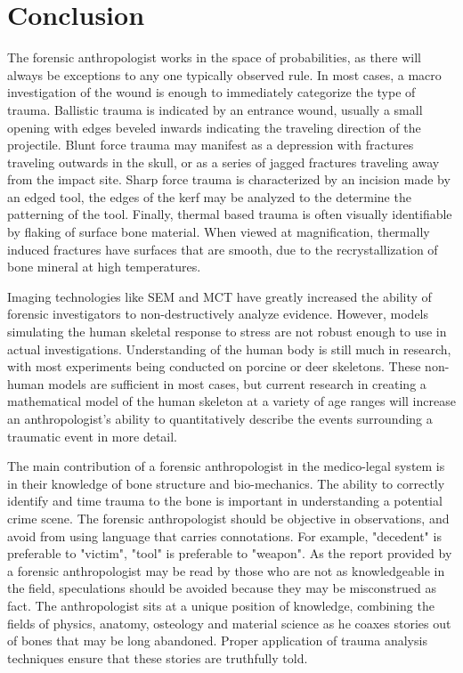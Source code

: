 \documentclass[titlepage]{article}
\begin{document}
\section{Conclusion}
The forensic anthropologist works in the space of probabilities, as there will always be exceptions to any one typically observed rule. In most cases, a macro investigation of the wound is enough to immediately categorize the type of trauma. Ballistic trauma is indicated by an entrance wound, usually a small opening with edges beveled inwards indicating the traveling direction of the projectile. Blunt force trauma may manifest as a depression with fractures traveling outwards in the skull, or as a series of jagged fractures traveling away from the impact site. Sharp force trauma is characterized by an incision made by an edged tool, the edges of the kerf may be analyzed to the determine the patterning of the tool. Finally, thermal based trauma is often visually identifiable by flaking of surface bone material. When viewed at magnification, thermally induced fractures have surfaces that are smooth, due to the recrystallization of bone mineral at high temperatures.

Imaging technologies like SEM and MCT have greatly increased the ability of forensic investigators to non-destructively analyze evidence. However, models simulating the human skeletal response to stress are not robust enough to use in actual investigations. Understanding of the human body is still much in research, with most experiments being conducted on porcine or deer skeletons.\cite{bft} These non-human models are sufficient in most cases, but current research in creating a mathematical model of the human skeleton at a variety of age ranges will increase an anthropologist's ability to quantitatively describe the events surrounding a traumatic event in more detail.

The main contribution of a forensic anthropologist in the medico-legal system is in their knowledge of bone structure and bio-mechanics. The ability to correctly identify and time trauma to the bone is important in understanding a potential crime scene. The forensic anthropologist should be objective in observations, and avoid from using language that carries connotations. For example, "decedent" is preferable to "victim", "tool" is preferable to "weapon". As the report provided by a forensic anthropologist may be read by those who are not as knowledgeable in the field, speculations should be avoided because they may be misconstrued as fact. The anthropologist sits at a unique position of knowledge, combining the fields of physics, anatomy, osteology and material science as he coaxes stories out of bones that may be long abandoned. Proper application of trauma analysis techniques ensure that these stories are truthfully told.

\newpage

\end{document}
